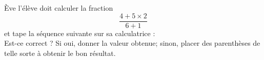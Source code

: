 
\begin{exercice}[\dots/3.5]\label{exosmath-0834}

    Ève l'élève doit calculer la fraction
    \begin{equation}
        \frac{ 4+5\times 2 }{ 6+1 }
    \end{equation}
    et tape la séquence suivante sur sa calculatrice :
    \begin{equation}
        
    \end{equation}
    Est-ce correct ? Si oui, donner la valeur obtenue; sinon, placer des parenthèses de telle sorte à obtenir le bon résultat.

\end{exercice}
